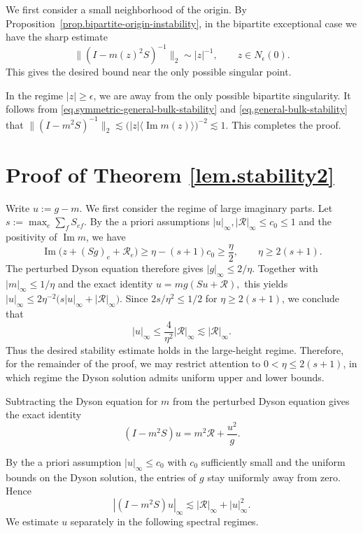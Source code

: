 \documentclass[11pt,twoside, a4paper]{article}
\numberwithin{equation}{section}
\numberwithin{figure}{section}
\theoremstyle{plain} %
\theoremstyle{definition}
\theoremstyle{remark}
\newcommand{\1} {\mspace{1 mu}}
\newcommand{\2} {\mspace{2 mu}}
\DeclareMathOperator{\im}{Im}
\begin{document}
We first consider a small neighborhood of the origin. By
Proposition~\ref{prop.bipartite-origin-instability}, in the bipartite
exceptional case we have the sharp estimate
\[
    \bigl\|(I-m(z)^2S)^{-1}\bigr\|_2\sim |z|^{-1},
    \qquad z\in N_\epsilon(0).
\]
This gives the desired bound near the only possible singular point.

In the regime \(|z|\ge \epsilon\), we are away from the only possible
bipartite singularity. It follows from \eqref{eq.symmetric-general-bulk-stability} and \eqref{eq.general-bulk-stability} that
$
    \|(I-m^2S)^{-1}\|_2\lesssim\big(|z|\langle\im m(z)\rangle\big)^{-2}\lesssim 1 .
$
This completes the proof.

\section{Proof of Theorem \ref{lem.stability2}}
Write
$
u:=g-m.
$
We first consider the regime of large imaginary parts.
Let $s:=\max_e\sum_f S_{ef}$.
By the a priori assumptions
$|u|_\infty,|\mathcal R|_\infty\le c_0\le 1$
and the positivity of $\im m$, we have
\[
    \im\bigl(z+(Sg)_e+\mathcal R_e\bigr)
    \ge \eta-(s+1)c_0
    \ge \frac{\eta}{2},
    \qquad \eta\ge 2(s+1).
\]
The perturbed Dyson equation therefore gives
$|g|_\infty\le 2/\eta$.
Together with $|m|_\infty\le 1/\eta$ and the exact identity
$
    u=mg(Su+\mathcal R),
$
this yields
$
    |u|_\infty
    \le 2\eta^{-2}
    \bigl(s|u|_\infty+|\mathcal R|_\infty\bigr).
$
Since $2s/\eta^2\le 1/2$ for $\eta\ge 2(s+1)$,
we conclude that
\[
    |u|_\infty
    \le \frac{4}{\eta^2}|\mathcal R|_\infty
    \lesssim |\mathcal R|_\infty.
\]
Thus the desired stability estimate holds in the
large-height regime.
Therefore, for the remainder of the proof, we may restrict attention to \(0<\eta\le 2(s+1)\), in which regime the Dyson solution admits uniform upper and lower bounds.

Subtracting the Dyson equation for $m$ from the perturbed Dyson equation gives
the exact identity
\begin{equation}
\label{e:bootstrap-exact-dyson-expansion}
(I-m^2S)u
=
m^2\mathcal{R}+\frac{u^2}{g}.
\end{equation}


By the a priori assumption $|u|_\infty\le c_0$ with $c_0$ sufficiently small and the
uniform bounds on the Dyson solution, the entries of $g$ stay uniformly
away from zero. Hence
\begin{equation}
\label{e:abstract-defect-from-displacement}
\left|(I-m^2S)u\right|_\infty
\lesssim
|\mathcal{R}|_\infty+|u|_\infty^2.
\end{equation}
We estimate $u$ separately in the following spectral regimes.
\end{document}
